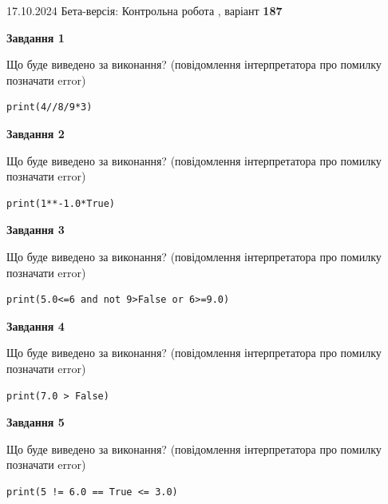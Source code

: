 \documentclass[12pt, ukrainian]{article}
\begin{document}
{\Large{17.10.2024 Бета-версія: Контрольна робота , варіант  \No \textbf { 187 }\par}}
{
\begin {large}
{\begin {center}\textbf{Завдання 1}\end {center}}

Що буде виведено за виконання? (повідомлення інтерпретатора про помилку позначати error)\par
\begin{verbatim}
print(4//8/9*3)
\end{verbatim}

{\begin {center}\textbf{Завдання 2}\end {center}}

Що буде виведено за виконання? (повідомлення інтерпретатора про помилку позначати error)\par
\begin{verbatim}
print(1**-1.0*True)
\end{verbatim}

{\begin {center}\textbf{Завдання 3}\end {center}}

Що буде виведено за виконання? (повідомлення інтерпретатора про помилку позначати error)\par
\begin{verbatim}
print(5.0<=6 and not 9>False or 6>=9.0)
\end{verbatim}

{\begin {center}\textbf{Завдання 4}\end {center}}

Що буде виведено за виконання? (повідомлення інтерпретатора про помилку позначати error)\par
\begin{verbatim}
print(7.0 > False)
\end{verbatim}

{\begin {center}\textbf{Завдання 5}\end {center}}

Що буде виведено за виконання? (повідомлення інтерпретатора про помилку позначати error)\par
\begin{verbatim}
print(5 != 6.0 == True <= 3.0)
\end{verbatim}


\end{large}}
\end{document}
